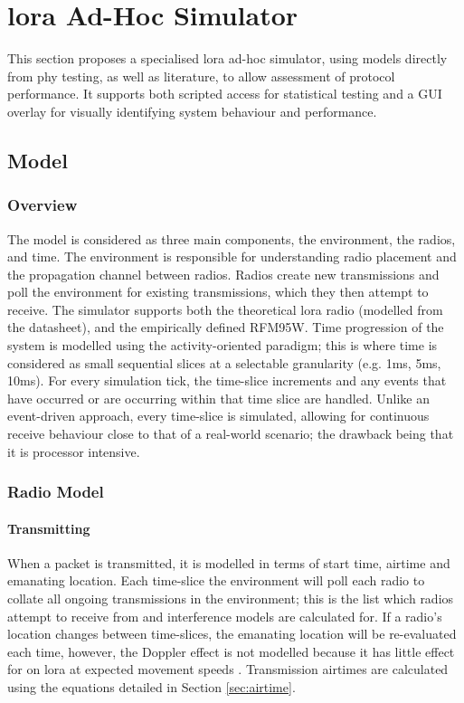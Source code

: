 \chapter{\ac{lora} Ad-Hoc Simulator}
This section proposes a specialised \ac{lora} ad-hoc simulator, using models directly from \ac{phy} testing, as well as literature, to allow assessment of protocol performance. It supports both scripted access for statistical testing and a GUI overlay for visually identifying system behaviour and performance. 

\section{Model}
\subsection{Overview}
The model is considered as three main components, the environment, the radios, and time. The environment is responsible for understanding radio placement and the propagation channel between radios. Radios create new transmissions and poll the environment for existing transmissions, which they then attempt to receive. The simulator supports both the theoretical \ac{lora} radio (modelled from the datasheet), and the empirically defined RFM95W. Time progression of the system is modelled using the activity-oriented paradigm; this is where time is considered as small sequential slices at a selectable granularity (e.g. 1ms, 5ms, 10ms). For every simulation tick, the time-slice increments and any events that have occurred or are occurring within that time slice are handled. Unlike an event-driven approach, every time-slice is simulated, allowing for continuous receive behaviour close to that of a real-world scenario; the drawback being that it is processor intensive.


\subsection{Radio Model}
\subsubsection{Transmitting}
When a packet is transmitted, it is modelled in terms of start time, airtime and emanating location. Each time-slice the environment will poll each radio to collate all ongoing transmissions in the environment; this is the list which radios attempt to receive from and interference models are calculated for. If a radio's location changes between time-slices, the emanating location will be re-evaluated each time, however, the Doppler effect is not modelled because it has little effect for  on \ac{lora} at expected movement speeds \cite{3YP:DOPLER_EFFECT}. Transmission airtimes are calculated using the equations detailed in Section \ref{sec:airtime}.

